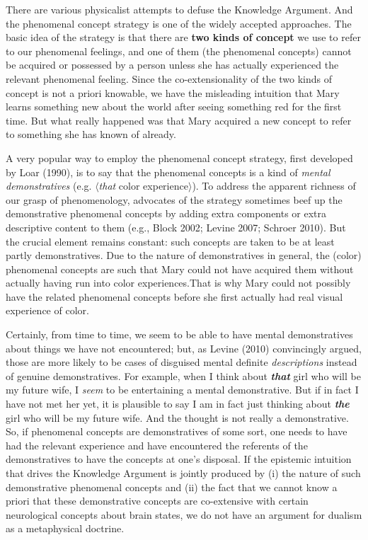 \documentclass[a4paper,12pt]{article}
\begin{document}
There are various physicalist attempts to defuse the Knowledge Argument. And the phenomenal concept strategy is one of the widely accepted approaches. The basic idea of the strategy is that there are \textbf{two kinds of concept} we use to refer to our phenomenal feelings, and one of them (the phenomenal concepts) cannot be acquired or possessed by a person unless she has actually experienced the relevant phenomenal feeling. Since the co-extensionality of the two kinds of concept is not a priori knowable, we have the misleading intuition that Mary learns something new about the world after seeing something red for the first time. But what really happened was that Mary acquired a new concept to refer to something she has known of already.

A very popular way to employ the phenomenal concept strategy, first developed by Loar (1990), is to say that the phenomenal concepts is a kind of \emph{mental demonstratives} (e.g. $\langle$\emph{that} color experience$\rangle$). To address the apparent richness of our grasp of phenomenology, advocates of the strategy sometimes beef up the demonstrative phenomenal concepts by adding extra components or extra descriptive content to them (e.g., Block 2002; Levine 2007; Schroer 2010). But the crucial element remains constant: such concepts are taken to be at least partly demonstratives. Due to the nature of demonstratives in general, the (color) phenomenal concepts are such that Mary could not have acquired them without actually having run into color experiences.\footnotemark That is why Mary could not possibly have the related phenomenal concepts before she first actually had real visual experience of color.


Certainly, from time to time, we seem to be able to have mental demonstratives about things we have not encountered; but, as Levine (2010) convincingly argued, those are more likely to be cases of disguised mental definite \emph{descriptions} instead of genuine demonstratives. For example, when I think about \emph{\textbf{that}} girl who will be my future wife, I \emph{seem} to be entertaining a mental demonstrative. But if in fact I have not met her yet, it is plausible to say I am in fact just thinking about \emph{\textbf{the}} girl who will be my future wife. And the thought is not really a demonstrative. So, if phenomenal concepts are demonstratives of some sort, one needs to have had the relevant experience and have encountered the referents of the demonstratives to have the concepts at one's disposal. If the epistemic intuition that drives the Knowledge Argument is jointly produced by (i) the nature of such demonstrative phenomenal concepts and (ii) the fact that we cannot know a priori that these demonstrative concepts are co-extensive with certain neurological concepts about brain states, we do not have an argument for dualism as a metaphysical doctrine.
\end{document}
